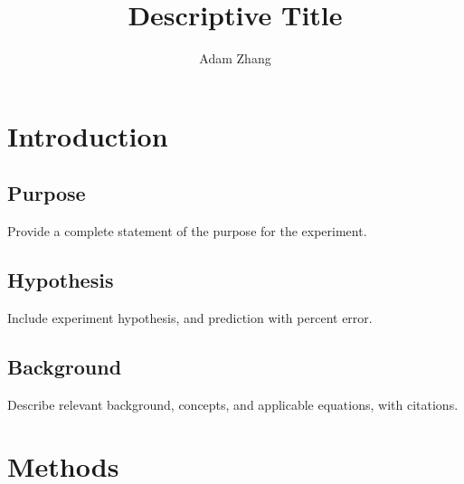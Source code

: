\documentclass[stu,biblatex,floatsintext,draftall]{apa7}
\title{Descriptive Title}
\author{Adam Zhang}
\affiliation{Academies of Loudoun}
\begin{document}
\maketitle
\tableofcontents
\newpage

\section{Introduction}

\subsection{Purpose}
Provide a complete statement of the purpose for the experiment.

\subsection{Hypothesis}
Include experiment hypothesis, and prediction with percent error.

\subsection{Background}
Describe relevant background, concepts, and applicable equations, with citations.

\section{Methods}
\end{document}
